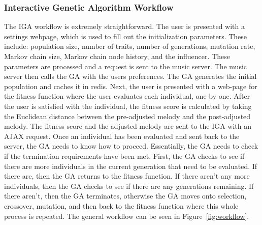 \documentclass[12pt]{article} %
\begin{document}
\subsubsection{Interactive Genetic Algorithm Workflow}
The IGA workflow is extremely straightforward. The user is presented with a settings webpage, which is used to fill out the initialization parameters. These include: population size, number of traits, number of generations, mutation rate, Markov chain size, Markov chain node history, and the influencer. These parameters are processed and a request is sent to the music server. The music server then calls the GA with the users preferences. The GA generates the initial population and caches it in redis. Next, the user is presented with a web-page for the fitness function where the user evaluates each individual, one by one. After the user is satisfied with the individual, the fitness score is calculated by taking the Euclidean distance between the pre-adjusted melody and the post-adjusted melody. The fitness score and the adjusted melody are sent to the IGA with an AJAX request. Once an individual has been evaluated and sent back to the server, the GA needs to know how to proceed. Essentially, the GA needs to check if the termination requirements have been met. First, the GA checks to see if there are more individuals in the current generation that need to be evaluated. If there are, then the GA returns to the fitness function. If there aren't any more individuals, then the GA checks to see if there are any generations remaining. If there aren't, then the GA terminates, otherwise the GA moves onto selection, crossover, mutation, and then back to the fitness function where this whole process is repeated. The general workflow can be seen in Figure~\ref{fig:workflow}.
\end{document}

